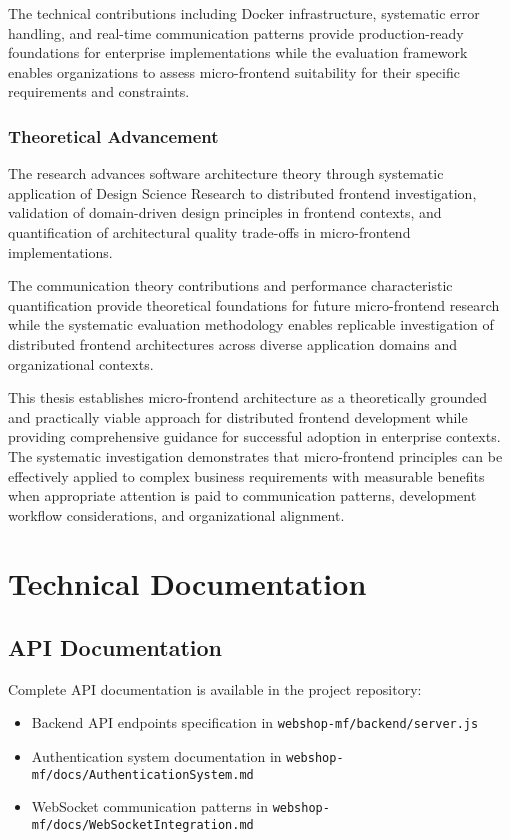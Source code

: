 \documentclass[12pt,a4paper]{report}
\begin{document}
The technical contributions including Docker infrastructure, systematic error handling, and real-time communication patterns provide production-ready foundations for enterprise implementations while the evaluation framework enables organizations to assess micro-frontend suitability for their specific requirements and constraints.

\subsection{Theoretical Advancement}

The research advances software architecture theory through systematic application of Design Science Research to distributed frontend investigation, validation of domain-driven design principles in frontend contexts, and quantification of architectural quality trade-offs in micro-frontend implementations.

The communication theory contributions and performance characteristic quantification provide theoretical foundations for future micro-frontend research while the systematic evaluation methodology enables replicable investigation of distributed frontend architectures across diverse application domains and organizational contexts.

This thesis establishes micro-frontend architecture as a theoretically grounded and practically viable approach for distributed frontend development while providing comprehensive guidance for successful adoption in enterprise contexts. The systematic investigation demonstrates that micro-frontend principles can be effectively applied to complex business requirements with measurable benefits when appropriate attention is paid to communication patterns, development workflow considerations, and organizational alignment.




\appendix
\chapter{Technical Documentation}
\section{API Documentation}
Complete API documentation is available in the project repository:
\begin{itemize}
\item Backend API endpoints specification in \texttt{webshop-mf/backend/server.js}
\item Authentication system documentation in \texttt{webshop-mf/docs/AuthenticationSystem.md}
\item WebSocket communication patterns in \texttt{webshop-mf/docs/WebSocketIntegration.md}
\end{itemize}
\end{document}
